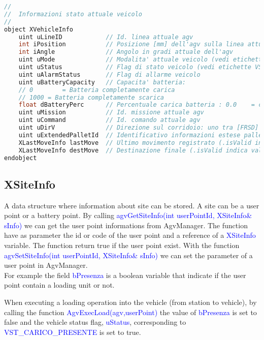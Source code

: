 \begin{lstlisting}[language=c++,caption= XVehicleInfo, label=lstXVehicleInfo]
//
//	Informazioni stato attuale veicolo
//
object XVehicleInfo
	uint uLineID            // Id. linea attuale agv
	int iPosition           // Posizione [mm] dell'agv sulla linea attuale
	int iAngle              // Angolo in gradi attuale dell'agv
	uint uMode              // Modalita' attuale veicolo (vedi etichette VM_***)
	uint uStatus            // Flag di stato veicolo (vedi etichette VST_***)
	uint uAlarmStatus       // Flag di allarme veicolo
	uint uBatteryCapacity   // Capacita' batteria:
	// 0		= Batteria completamente carica
	// 1000	= Batteria completamente scarica
	float dBatteryPerc      // Percentuale carica batteria : 0.0	= completamente scarica, 100.0 = completamente carica
	uint uMission           // Id. missione attuale agv
	uint uCommand           // Id. comando attuale agv
	uint uDirV              // Direzione sul corridoio: uno tra [FRSD]
	uint uExtendedPalletId  // Identificativo informazioni estese pallet (se presenti)
	XLastMoveInfo lastMove  // Ultimo movimento registrato (.isValid indica validita', in piu' se non valido, .uLine == 0)
	XLastMoveInfo destMove  // Destinazione finale (.isValid indica validita', in piu' se non valido, .uLine == 0)
endobject
\end{lstlisting}
%
\subsection{XSiteInfo}
A data structure where information about site can be stored. A site can be a user point or a battery point.
By calling \textcolor{blue}{agvGetSiteInfo(int userPointId, XSiteInfo\& sInfo)} we can get the user point informations from AgvManager. The function have as parameter the id or code of the user point and a reference of a \textcolor{blue}{XSiteInfo} variable.
The function return true if the user point exist.
With the function \textcolor{blue}{agvSetSiteInfo(int userPointId, XSiteInfo\& sInfo)} we can set the parameter of a user point in AgvManager.\\

For example the field \textcolor{blue}{bPresenza} is a boolean variable that indicate if the user point contain a loading unit or not.

When executing a loading operation into the vehicle (from station to vehicle), by calling the function \textcolor{blue}{AgvExecLoad(agv,userPoint)} the value of \textcolor{blue}{bPresenza} is set to false and the vehicle status flag, \textcolor{blue}{uStatus}, corresponding to \textcolor{blue}{VST\_CARICO\_PRESENTE} is set to true.

